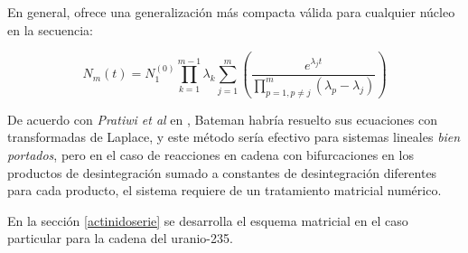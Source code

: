 En general, \cite{Loch.2013} ofrece una generalización más compacta válida para cualquier núcleo en la secuencia:

\begin{equation}
        N_m(t)=N_1^{(0)} \prod_{k=1}^{m-1}\lambda_k\sum_{j=1}^{m}\left(\frac{e^{\lambda_j t}}{\prod\limits_{p=1, p\neq j}^{m}\left(\lambda_p-\lambda_j\right)}\right) \label{batemangeneral}
\end{equation}

\noindent De acuerdo con \textit{Pratiwi et al} en \cite{Pratiwi.2021}, Bateman habría resuelto sus ecuaciones con transformadas de Laplace, y este método sería efectivo para sistemas lineales \textit{bien portados}, pero en el caso de reacciones en cadena con bifurcaciones en los productos de desintegración sumado a constantes de desintegración diferentes para cada producto, el sistema requiere de un tratamiento matricial numérico. 

En la sección \ref{actinidoserie} se desarrolla el esquema matricial en el caso particular para la cadena del uranio-235. 